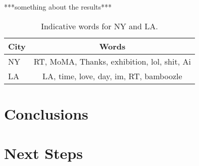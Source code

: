 \documentclass[12pt]{article}
\begin{document}
***something about the results***

\begin{table}
	\begin{center}
		\begin{tabular}{| l || c |}
			\hline
			City & Words \\ \hline
			NY & RT, MoMA, Thanks, exhibition, lol, shit, Ai \\ \hline
			LA & LA, time, love, day, im, RT, bamboozle \\ 
			\hline
		\end{tabular}
	\end{center}
	\caption{Indicative words for NY and LA.}
	\label{table:poploc}
\end{table}

\section*{Conclusions}


\section*{Next Steps}




\end{document}
